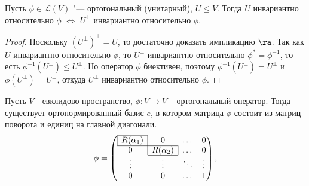 \begin{proposition}
    Пусть $\phi\in \mathcal{L}(V)$ "--- ортогональный (унитарный), $U \le V$. Тогда $U$ инвариантно относительно $\phi$ $\Leftrightarrow$ $U^\perp$ инвариантно относительно $\phi$.
\end{proposition}

\begin{proof}
    Поскольку $(U^\perp)^\perp = U$, то достаточно доказать импликацию $\ra$. Так как $U$ инвариантно относительно $\phi$, то $U^\perp$ инвариантно относительно $\phi^* = \phi^{-1}$, то есть $\phi^{-1}(U^\perp) \le U^\perp$. Но оператор $\phi$ биективен, поэтому $\phi^{-1}(U^\perp) = U^\perp$ и $\phi(U^\perp) = U^\perp$, откуда $U^\perp$ инвариантно относительно $\phi$.
\end{proof}

\begin{theorem}
    Пусть $V$ - евклидово пространство, $\phi: V \to V$ -- ортогональный оператор. Тогда существует ортонормированный базис $e$, в котором матрица $\phi$ состоит из матриц поворота и единиц на главной диагонали.
     \[\phi = \left(\begin{array}{@{}cccc@{}}
        \cline{1-1}
        \multicolumn{1}{|c|}{R(\alpha_1)} & 0 & \dots & 0\\
        \cline{1-2}
        0 & \multicolumn{1}{|c|}{R(\alpha_2)} & \dots & 0\\
        \cline{2-2}
        \vdots & \vdots & \ddots & \vdots\\
        0 & 0 & \dots & 1\\
    \end{array}\right),\]
\end{theorem}


